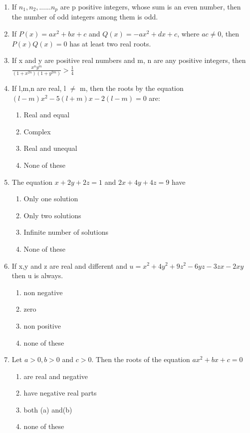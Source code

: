 \documentclass[journal,12pt,twocolumn]{IEEEtran}
\begin{document}
\begin{enumerate}[label=\arabic*]
\item If $n_1, n_2,......n_p$ are p positive integers, whose sum is an even number, then the number of odd integers among them is odd.

\item If $P(x)=ax^{2}+bx+c$ and $Q(x)=-ax^{2}+dx+c$, where $ac\neq0$, then $P(x)Q(x)=0$ has at least two real roots.

\item If x and y are positive real numbers and m, n are any positive integers, then $\frac{x^{n}y^{m}}{(1+x^{2n})(1+y^{2m})}>\frac{1}{4}$

\item If l,m,n are real, l $\neq$ m, then the roots by the equation $(l-m)x^{2}-5(l+m)x-2(l-m)=0$ are:
\begin{enumerate}
\item Real and equal
\item Complex
\item Real and unequal
\item None of these
\end{enumerate}
 
\item The equation $x+2y+2z=1$ and $2x+4y+4z=9$ have
\begin{enumerate}
\item Only one solution 
\item Only two solutions
\item Infinite number of solutions
\item None of these
\end{enumerate}
 
\item If x,y and z are real and different and $u=x^{2}+4y^{2}+9z^{2}-6yz-3zx-2xy$ then u is always.
\begin{enumerate}
\item non negative
\item zero
\item non positive
\item none of these
\end{enumerate}

\item Let $a>0,b>0$ and $c>0$. Then the roots of the equation $ax^{2}+bx+c=0$
\begin{enumerate}
\item are real and negative
\item have negative real parts
\item both (a) and(b)
\item none of these
\end{enumerate}


\end{enumerate}
\end{document}
